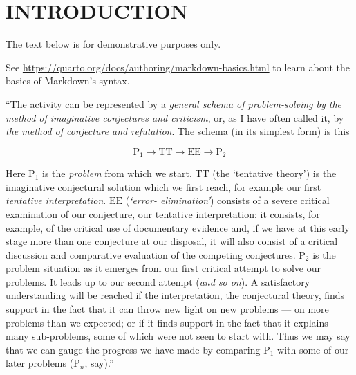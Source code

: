 \documentclass[
  12pt,
  a4paper,
  oneside]{tesesusp}
\begin{document}
\hypertarget{introduction}{%
\chapter{INTRODUCTION}\label{introduction}}

\textual

\begin{tcolorbox}[enhanced jigsaw, titlerule=0mm, toprule=.15mm, left=2mm, rightrule=.15mm, breakable, title=\textcolor{quarto-callout-note-color}{\faInfo}\hspace{0.5em}{Note}, bottomrule=.15mm, coltitle=black, leftrule=.75mm, colframe=quarto-callout-note-color-frame, opacitybacktitle=0.6, bottomtitle=1mm, toptitle=1mm, colbacktitle=quarto-callout-note-color!10!white, arc=.35mm, opacityback=0, colback=white]

The text below is for demonstrative purposes only.

\vspace{5pt}

See \url{https://quarto.org/docs/authoring/markdown-basics.html} to
learn about the basics of Markdown's syntax.

\end{tcolorbox}

\vspace{10pt}

``The activity can be represented by a \emph{general schema of
problem-solving by the method of imaginative conjectures and criticism},
or, as I have often called it, by \emph{the method of conjecture and
refutation}. The schema (in its simplest form) is this

\[
\text{P}_{1} \to \text{TT} \to \text{EE} \to \text{P}_{2} 
\]

\vspace{15pt}

Here \(\text{P}_{1}\) is the \emph{problem} from which we start,
\(\text{TT}\) (the `tentative theory') is the imaginative conjectural
solution which we first reach, for example our first \emph{tentative
interpretation}. \(\text{EE}\) (\emph{`error- elimination'}) consists of
a severe critical examination of our conjecture, our tentative
interpretation: it consists, for example, of the critical use of
documentary evidence and, if we have at this early stage more than one
conjecture at our disposal, it will also consist of a critical
discussion and comparative evaluation of the competing conjectures.
\(\text{P}_{2}\) is the problem situation as it emerges from our first
critical attempt to solve our problems. It leads up to our second
attempt (\emph{and so on}). A satisfactory understanding will be reached
if the interpretation, the conjectural theory, finds support in the fact
that it can throw new light on new problems --- on more problems than we
expected; or if it finds support in the fact that it explains many
sub-problems, some of which were not seen to start with. Thus we may say
that we can gauge the progress we have made by comparing
\(\text{P}_{1}\) with some of our later problems (\(\text{P}_{n}\),
say).''
\end{document}
